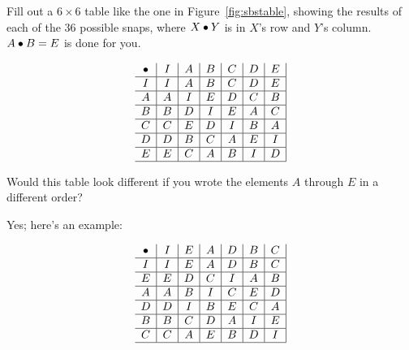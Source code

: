 \documentclass[../gatm_answers.tex]{subfiles}
\begin{document}
\begin{outer_problem}[start=1]
	\item Fill out a $6\times 6$ table like the one in Figure~\ref{fig:sbstable}, showing the results of each of the $36$ possible snaps, where $X\bullet Y$ is in $X$'s row and $Y$'s column.
	      $A\bullet B=E$ is done for you.
\end{outer_problem}

%             
$$\begin{array}{c|c|c|c|c|c|c|}
\bullet & I & A & B & C & D & E \\ \hline
I & I & A & B & C & D & E \\ \hline
A & A & I & E & D & C & B \\ \hline
B & B & D & I & E & A & C \\ \hline
C & C & E & D & I & B & A \\ \hline
D & D & B & C & A & E & I \\ \hline
E & E & C & A & B & I & D \\ \hline
\end{array}$$

\begin{outer_problem}
	\item Would this table look different if you wrote the elements $A$ through $E$ in a different order?
\end{outer_problem}

Yes; here's an example:


$$\begin{array}{c|c|c|c|c|c|c|}
\bullet & I & E & A & D & B & C \\ \hline
I & I & E & A & D & B & C \\ \hline
E & E & D & C & I & A & B \\ \hline
A & A & B & I & C & E & D \\ \hline
D & D & I & B & E & C & A \\ \hline
B & B & C & D & A & I & E \\ \hline
C & C & A & E & B & D & I \\ \hline
\end{array}$$
\end{document}
